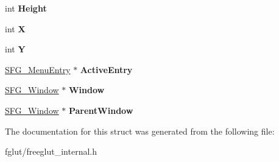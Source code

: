 \begin{DoxyCompactItemize}
\item 
int {\bfseries Height}\hypertarget{structtag_s_f_g___menu_a7992cd7e1feb9e9f70364543cb30e744}{}\label{structtag_s_f_g___menu_a7992cd7e1feb9e9f70364543cb30e744}

\item 
int {\bfseries X}\hypertarget{structtag_s_f_g___menu_ab4e9eece2d160f5947b550387f3e39a8}{}\label{structtag_s_f_g___menu_ab4e9eece2d160f5947b550387f3e39a8}

\item 
int {\bfseries Y}\hypertarget{structtag_s_f_g___menu_afb0c69c79153b0624f183a917654b892}{}\label{structtag_s_f_g___menu_afb0c69c79153b0624f183a917654b892}

\item 
\hyperlink{structtag_s_f_g___menu_entry}{S\+F\+G\+\_\+\+Menu\+Entry} $\ast$ {\bfseries Active\+Entry}\hypertarget{structtag_s_f_g___menu_a7a68164b52f66d3dabfcf9c864853ac5}{}\label{structtag_s_f_g___menu_a7a68164b52f66d3dabfcf9c864853ac5}

\item 
\hyperlink{structtag_s_f_g___window}{S\+F\+G\+\_\+\+Window} $\ast$ {\bfseries Window}\hypertarget{structtag_s_f_g___menu_ae8697a875e322abcbbeeaaeec38a9ba4}{}\label{structtag_s_f_g___menu_ae8697a875e322abcbbeeaaeec38a9ba4}

\item 
\hyperlink{structtag_s_f_g___window}{S\+F\+G\+\_\+\+Window} $\ast$ {\bfseries Parent\+Window}\hypertarget{structtag_s_f_g___menu_ab60114425eb28e25f7ecb87078f9f5e5}{}\label{structtag_s_f_g___menu_ab60114425eb28e25f7ecb87078f9f5e5}

\end{DoxyCompactItemize}


The documentation for this struct was generated from the following file\+:\begin{DoxyCompactItemize}
\item 
fglut/freeglut\+\_\+internal.\+h\end{DoxyCompactItemize}
